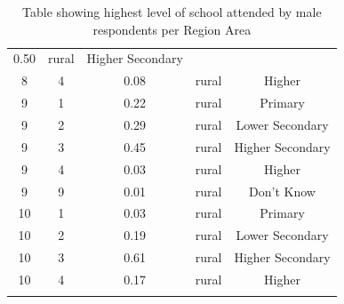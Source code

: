\documentclass[stu, 12pt, floatsintext,longtable]{apa7}
\begin{document}
\begin{longtable}{ccccc}
    0.50
                                                       &
    rural                                              & Higher Secondary
    \\
    8                                                  & 4                    &
    0.08
                                                       &
    rural                                              & Higher
    \\
    9                                                  & 1                    &
    0.22
                                                       &
    rural                                              & Primary
    \\
    9                                                  & 2                    &
    0.29
                                                       &
    rural                                              & Lower Secondary
    \\
    9                                                  & 3                    &
    0.45
                                                       &
    rural                                              & Higher Secondary
    \\
    9                                                  & 4                    &
    0.03
                                                       &
    rural                                              & Higher
    \\
    9                                                  & 9                    &
    0.01
                                                       &
    rural                                              & Don't Know
    \\
    10                                                 & 1                    &
    0.03
                                                       &
    rural                                              & Primary
    \\
    10                                                 & 2                    &
    0.19
                                                       &
    rural                                              & Lower Secondary
    \\
    10                                                 & 3                    &
    0.61
                                                       &
    rural                                              & Higher Secondary
    \\
    10                                                 & 4                    &
    0.17
                                                       &
    rural                                              & Higher
    \\

    \bottomrule
    \caption{Table showing highest level of school attended by male respondents
        per Region Area}
\end{longtable}
\end{document}
